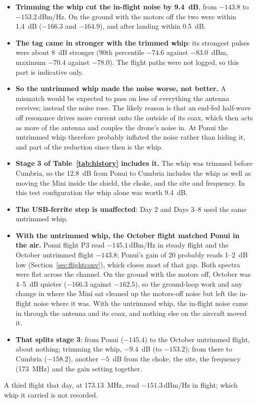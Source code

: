\documentclass[11pt]{article}
\newcommand{\dBmHz}{\,dBm/Hz}
\begin{document}
\begin{itemize}
\item \textbf{Trimming the whip cut the in-flight noise by 9.4~dB}, from $-143.8$ to
$-153.2$\dBmHz{}. On the ground with the motors off the two were within 1.4~dB ($-166.3$ and
$-164.9$), and after landing within 0.5~dB.
\item \textbf{The tag came in stronger with the trimmed whip}: its strongest pulses were about 8~dB
stronger (90th percentile $-74.6$ against $-83.0$~dBm, maximum $-70.4$ against $-78.0$). The flight
paths were not logged, so this part is indicative only.
\item \textbf{So the untrimmed whip made the noise worse, not better.} A mismatch would be expected to
pass on less of everything the antenna receives; instead the noise rose. The likely reason is that an
end-fed half-wave off resonance drives more current onto the outside of its coax, which then acts as
more of the antenna and couples the drone's noise in. At Ponui the untrimmed whip therefore probably
inflated the noise rather than hiding it, and part of the reduction since then is the whip.
\item \textbf{Stage 3 of Table~\ref{tab:history} includes it.} The whip was trimmed before Cumbria,
so the 12.8~dB from Ponui to Cumbria includes the whip as well as moving the Mini inside the shield, the
choke, and the site and frequency. In this test configuration the whip alone was worth 9.4~dB.
\item \textbf{The USB-ferrite step is unaffected}: Day 2 and Days 3--8 used the same untrimmed whip.
\item \textbf{With the untrimmed whip, the October flight matched Ponui in the air.} Ponui flight P3
read $-145.1$\dBmHz{} in steady flight and the October untrimmed flight $-143.8$; Ponui's gain of 20
probably reads 1--2~dB low (Section~\ref{sec:flightconv}), which closes most of that gap. Both spectra
were flat across the channel. On the ground with the motors off, October was 4--5~dB quieter
($-166.3$ against $-162.5$), so the ground-loop work and any change in where the Mini sat cleaned up
the motors-off noise but left the in-flight noise where it was. With the untrimmed whip, the in-flight
noise came in through the antenna and its coax, and nothing else on the aircraft moved it.
\item \textbf{That splits stage 3}: from Ponui ($-145.4$) to the October untrimmed flight, about
nothing; trimming the whip, $-9.4$~dB (to $-153.2$); from there to Cumbria ($-158.2$), another
$-5$~dB from the choke, the site, the frequency (173~MHz) and the gain setting together.
\end{itemize}
A third flight that day, at 173.13~MHz, read $-151.3$\dBmHz{} in flight; which whip it carried is
not recorded.
\end{document}
